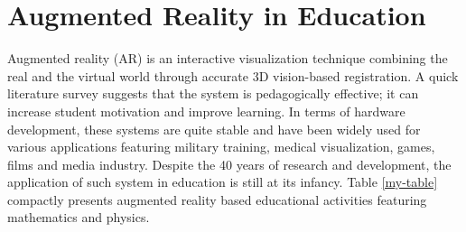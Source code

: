 \documentclass[conference]{IEEEtran}
\begin{document}
\section{Augmented Reality in Education}Augmented reality (AR) is an interactive visualization technique combining the 
real and the virtual world through accurate 3D vision-based registration. A quick literature survey suggests that the 
system is pedagogically effective; it can increase student motivation and improve learning. In terms of hardware 
development, these systems are quite stable and have been widely used for various applications featuring military 
training, medical visualization, games, films and media industry. Despite the 40 years of research and development, the 
application of such system in education is still at its infancy. Table \ref{my-table} compactly presents augmented 
reality based educational activities featuring mathematics and physics.
\end{document}
